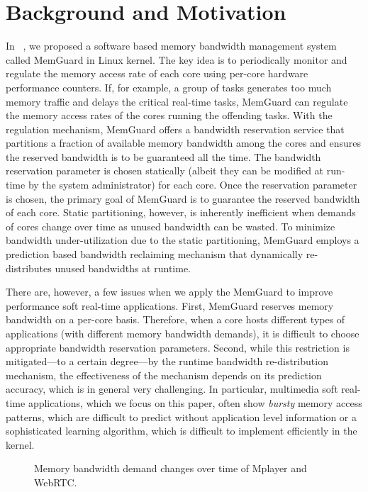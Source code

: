 \documentclass[times, 10pt,onecolumn]{article}
\begin{document}
\section{Background and Motivation} \label{sec:motivation}

In ~\cite{yun2013rtas}, we proposed a software based
memory bandwidth management system called MemGuard in Linux
kernel. The key idea is to periodically monitor and
regulate the memory access rate of each core using per-core hardware
performance counters. If, for example, a group
of tasks generates too much memory traffic and delays the
critical real-time tasks, MemGuard can regulate the memory access rates of
the cores running the offending tasks. With the regulation mechanism,
MemGuard offers a bandwidth reservation service that partitions a
fraction of available memory bandwidth among the cores and ensures the
reserved bandwidth is to be guaranteed all the time. The bandwidth
reservation parameter is chosen statically (albeit they can be modified
at run-time by the system administrator) for each core. Once the
reservation parameter is chosen, the primary goal of MemGuard is to
guarantee the reserved bandwidth of each core.
Static partitioning,
however, is inherently inefficient when demands of cores change over time
as unused bandwidth can be wasted.
To minimize bandwidth under-utilization due to the static partitioning,
MemGuard employs a prediction based bandwidth reclaiming mechanism
that dynamically re-distributes unused bandwidths at runtime.

There are, however, a few issues when we apply the MemGuard to
improve performance soft real-time applications. First, MemGuard
reserves memory bandwidth on a per-core basis. Therefore, when a core
hosts different types of applications (with different memory bandwidth
demands), it is difficult to choose appropriate bandwidth reservation
parameters.
Second, while this restriction is mitigated---to a certain degree---by
the runtime bandwidth re-distribution mechanism, the effectiveness of
the mechanism depends on its prediction accuracy, which is in general
very challenging.
In particular, multimedia soft real-time applications, which we focus
on this paper, often show \emph{bursty} memory access patterns, which
are difficult to predict without application level information or a
sophisticated learning algorithm, which is difficult to implement
efficiently in the kernel.

\begin{figure}[t]
\centering
\centering
{}
\caption{Memory bandwidth demand changes over time of Mplayer and WebRTC. }
\label{fig:motivation}
\end{figure}
\end{document}
